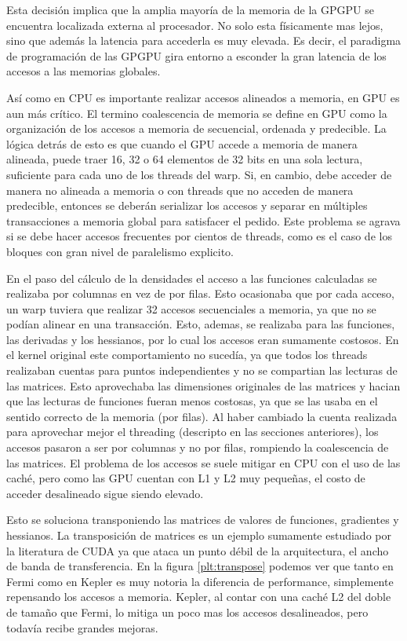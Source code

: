 Esta decisi\'on implica que la amplia mayor\'ia de la memoria de la GPGPU se encuentra
localizada externa al procesador.  No solo esta f\'isicamente mas lejos, sino que
adem\'as la latencia para accederla es muy elevada. Es decir, el paradigma de
programaci\'on de las GPGPU gira entorno a esconder la gran latencia de los accesos
a las memorias globales.

As\'i como en CPU es importante realizar accesos alineados a memoria, en GPU es aun m\'as cr\'itico.
El termino coalescencia de memoria se define en GPU como la organizaci\'on de los accesos a memoria de secuencial, ordenada y predecible.
La l\'ogica detr\'as de esto es que cuando el GPU accede a memoria de manera alineada, puede traer 16, 32 o 64 elementos de 32 bits en una sola lectura, suficiente para
cada uno de los threads del warp. Si, en cambio, debe acceder de manera no
alineada a memoria o con threads que no acceden de manera predecible, entonces
se deber\'an serializar los accesos y separar en m\'ultiples transacciones a memoria global para satisfacer
el pedido. Este problema se agrava si se debe hacer accesos frecuentes
por cientos de threads, como es el caso de los bloques con gran nivel de paralelismo explicito.

En el paso del c\'alculo de la densidades el acceso a las funciones calculadas
se realizaba por columnas en vez de por filas. Esto ocasionaba que por cada acceso,
un warp tuviera que realizar 32 accesos secuenciales a memoria, ya que no se pod\'ian alinear
en una transacci\'on. Esto, ademas, se realizaba para las funciones, las derivadas y los
hessianos, por lo cual los accesos eran sumamente costosos. En el kernel original este comportamiento
no suced\'ia, ya que todos los threads realizaban cuentas para puntos independientes y no se compartian las
lecturas de las matrices. Esto aprovechaba las dimensiones originales de las matrices y hacian que las lecturas de
funciones fueran menos costosas, ya que se las usaba en el sentido correcto de la memoria (por filas).
Al haber cambiado la cuenta realizada para aprovechar mejor el threading (descripto en las secciones anteriores),
los accesos pasaron a ser por columnas y no por filas, rompiendo la coalescencia de las matrices. El
problema de los accesos se suele mitigar en CPU con el uso de las cach\'e, pero como las GPU cuentan
con L1 y L2 muy peque\~nas, el costo de acceder desalineado sigue siendo elevado.

Esto se soluciona transponiendo las matrices de valores de funciones, gradientes y hessianos.
La transposici\'on de matrices es un ejemplo sumamente estudiado por la literatura de CUDA
ya que ataca un punto d\'ebil de la arquitectura, el ancho de banda de transferencia. En la figura
\ref{plt:transpose} podemos ver que tanto en Fermi como en Kepler es muy notoria la diferencia
de performance, simplemente repensando los accesos a memoria. Kepler, al contar con una cach\'e L2
del doble de tama\~no que Fermi, lo mitiga un poco mas los accesos desalineados, pero todav\'ia recibe
grandes mejoras.

